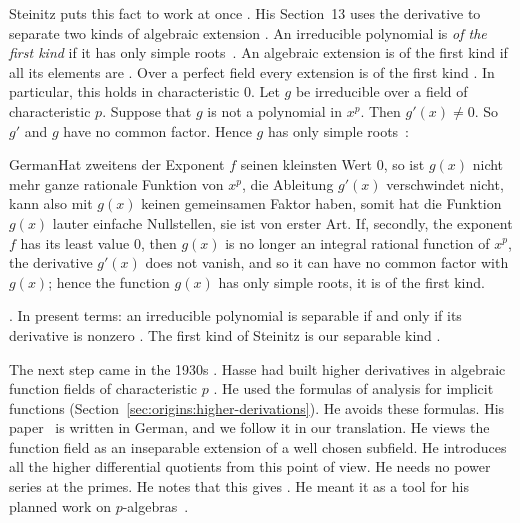 Steinitz puts this fact to work at once \cite[\S 13, p.~231]{Steinitz1910}.
His Section~13 uses the derivative to separate two kinds of algebraic
extension \cite[\S 13, p.~231]{Steinitz1910}. An irreducible polynomial is
\emph{of the first kind} if it has only simple roots~\cite[\S 13,
p.~231]{Steinitz1910}. An algebraic extension is of the first kind if all its
elements are \cite[\S 13, p.~231]{Steinitz1910}. Over a perfect field every extension is of the first kind \cite[\S 13, p.~231]{Steinitz1910}. In
particular, this holds in characteristic $0$. Let $g$ be irreducible over a
field of characteristic $p$. Suppose that $g$ is not a polynomial in $x^p$.
Then $g'(x) \neq 0$. So $g'$ and $g$ have no common factor. Hence $g$ has only
simple roots~\cite[\S 13, pp.~231--232]{Steinitz1910}:
\begin{originalquote}{German}{Hat zweitens der Exponent $f$ seinen kleinsten
Wert $0$, so ist $g(x)$ nicht mehr ganze rationale Funktion von $x^p$, die
Ableitung $g'(x)$ verschwindet nicht, kann also mit $g(x)$ keinen gemeinsamen
Faktor haben, somit hat die Funktion $g(x)$ lauter einfache Nullstellen, sie
ist von erster Art.} If, secondly, the exponent $f$ has its least value $0$,
then $g(x)$ is no longer an integral rational function of $x^p$, the
derivative $g'(x)$ does not vanish, and so it can have no common factor with
$g(x)$; hence the function $g(x)$ has only simple roots, it is of the first
kind. \end{originalquote} \noindent\cite[\S 13, p.~232]{Steinitz1910}. In
present terms: an irreducible polynomial is separable if and only if its
derivative is nonzero \cite[\S 13, p.~231]{Steinitz1910}. The first kind of Steinitz is our separable kind \cite[\S 13, p.~231]{Steinitz1910}.

The next step came in the 1930s \cite{Teichmueller1936}. Hasse had built
higher derivatives in algebraic function fields of characteristic $p$
\cite{Teichmueller1936}. He used the formulas of analysis for implicit
functions (Section~\ref{sec:origins:higher-derivations}). He avoids these
formulas. His paper~\cite{Teichmueller1936} is written in German, and we
follow it in our translation. He views the function field as an inseparable
extension of a well chosen subfield. He introduces all the higher
differential quotients from this point of view. He needs no power series at
the primes. He notes that this gives . He meant it as a tool for his planned work on
$p$-algebras~\cite[p.~89]{Teichmueller1936}.

